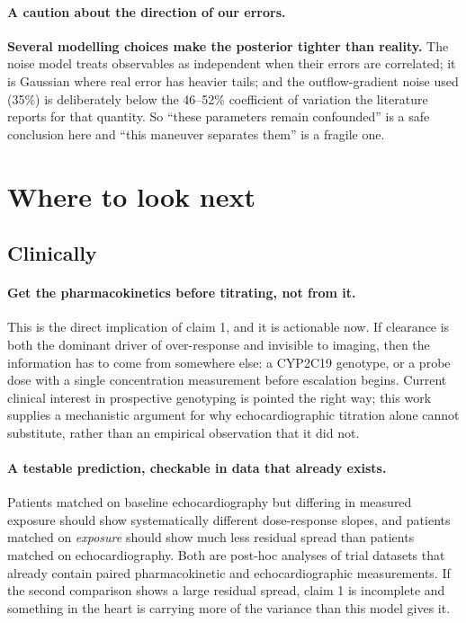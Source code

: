 \documentclass[11pt,a4paper]{article}
\newcommand{\caution}[1]{\textcolor{warn}{\textbf{#1}}}
\begin{document}
\paragraph{A caution about the direction of our errors.} \caution{Several modelling choices
make the posterior tighter than reality.} The noise model treats observables as independent
when their errors are correlated; it is Gaussian where real error has heavier tails; and the
outflow-gradient noise used (35\%) is deliberately below the 46--52\% coefficient of
variation the literature reports for that quantity. So ``these parameters remain confounded''
is a safe conclusion here and ``this maneuver separates them'' is a fragile one.

\section{Where to look next}

\subsection{Clinically}

\paragraph{Get the pharmacokinetics before titrating, not from it.} This is the direct
implication of claim 1, and it is actionable now. If clearance is both the dominant driver
of over-response and invisible to imaging, then the information has to come from somewhere
else: a CYP2C19 genotype, or a probe dose with a single concentration measurement before
escalation begins. Current clinical interest in prospective genotyping is pointed the right
way; this work supplies a mechanistic argument for why echocardiographic titration alone
cannot substitute, rather than an empirical observation that it did not.

\paragraph{A testable prediction, checkable in data that already exists.} Patients matched on
baseline echocardiography but differing in measured exposure should show systematically
different dose-response slopes, and patients matched on \emph{exposure} should show much less
residual spread than patients matched on echocardiography. Both are post-hoc analyses of
trial datasets that already contain paired pharmacokinetic and echocardiographic
measurements. If the second comparison shows a large residual spread, claim 1 is incomplete
and something in the heart is carrying more of the variance than this model gives it.
\end{document}
